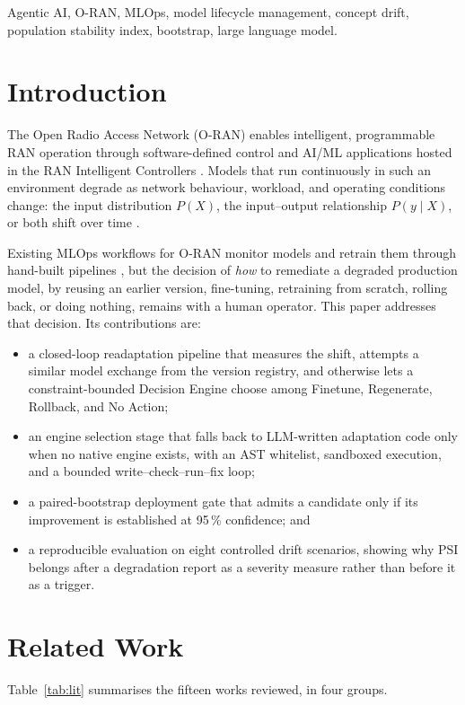 \documentclass[conference]{IEEEtran}
\begin{document}
\begin{IEEEkeywords}
Agentic AI, O-RAN, MLOps, model lifecycle management, concept drift, population stability
index, bootstrap, large language model.
\end{IEEEkeywords}

\section{Introduction}
The Open Radio Access Network (O-RAN) enables intelligent, programmable RAN operation through
software-defined control and AI/ML applications hosted in the RAN Intelligent Controllers
\cite{polese2023understanding}. Models that run continuously in such an environment degrade as
network behaviour, workload, and operating conditions change: the input distribution $P(X)$, the
input--output relationship $P(y\mid X)$, or both shift over time \cite{ditzler2015learning}.

Existing MLOps workflows for O-RAN monitor models and retrain them through hand-built pipelines
\cite{li2022rlops,parraullauri2025reason}, but the decision of \emph{how} to remediate a degraded
production model, by reusing an earlier version, fine-tuning, retraining from scratch, rolling
back, or doing nothing, remains with a human operator. This paper addresses that decision. Its
contributions are:
\begin{itemize}
\item a closed-loop readaptation pipeline that measures the shift, attempts a similar model
exchange from the version registry, and otherwise lets a constraint-bounded Decision Engine
choose among Finetune, Regenerate, Rollback, and No Action;
\item an engine selection stage that falls back to LLM-written adaptation code only when no
native engine exists, with an AST whitelist, sandboxed execution, and a bounded
write--check--run--fix loop;
\item a paired-bootstrap deployment gate that admits a candidate only if its improvement is
established at 95\,\% confidence; and
\item a reproducible evaluation on eight controlled drift scenarios, showing why PSI belongs
after a degradation report as a severity measure rather than before it as a trigger.
\end{itemize}

\section{Related Work}
Table~\ref{tab:lit} summarises the fifteen works reviewed, in four groups.
\end{document}
